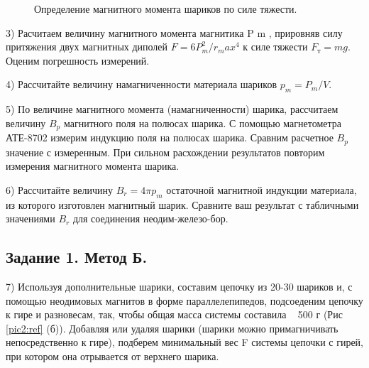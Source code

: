 \documentclass[a4paper,12pt]{article} %
\begin{document}
\begin{figure}[H]
\noindent{}
\caption{Определение магнитного момента шариков по силе тяжести.}
\label{pic1:ref}
\end{figure}

3) Расчитаем величину магнитного момента магнитика P m , прировняв силу притяжения двух магнитных диполей $F = 6P_m^2 /r_max^4$ к силе тяжести $F_\text{т} = mg$. Оценим погрешность измерений.

4) Рассчитайте величину намагниченности материала шариков $p_m = P_m / V$.

5) По величине магнитного момента (намагниченности) шарика, рассчитаем величину $B_p$ магнитного поля на полюсах шарика. С помощью магнетометра АТЕ-8702 измерим индукцию поля на полюсах шарика. Сравним расчетное $B_p$ значение с измеренным. При сильном расхождении результатов повторим измерения магнитного момента шарика.

6) Рассчитайте величину $B_r = 4 \pi p_m$ остаточной магнитной индукции материала, из которого изготовлен магнитный шарик. Сравните ваш результат с табличными значениями $B_r$ для соединения неодим-железо-бор.

\subsection{Задание 1. Метод Б.}

7) Используя дополнительные шарики, составим цепочку из 20-30 шариков и, с помощью неодимовых магнитов в форме параллелепипедов, подсоеденим цепочку к гире и разновесам, так, чтобы общая масса системы составила ~ 500 г (Рис \eqref{pic2:ref} (б)). Добавляя или удаляя шарики (шарики можно примагничивать непосредственно к гире), подберем минимальный вес F системы цепочки с гирей, при котором она отрывается от верхнего шарика.
\end{document}
